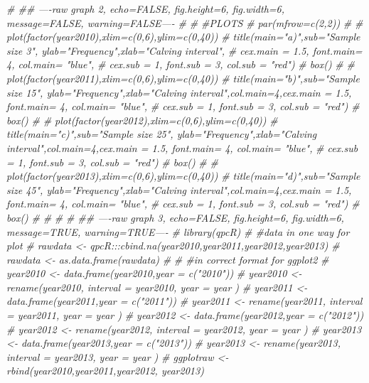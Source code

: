 \documentclass[]{book}
\newenvironment{Shaded}{\begin{snugshade}}{\end{snugshade}}
\newcommand{\CommentTok}[1]{\textcolor[rgb]{0.56,0.35,0.01}{\textit{#1}}}
\begin{document}
\begin{Shaded}
\begin{Highlighting}[]
\CommentTok{# ## ----raw graph 2, echo=FALSE, fig.height=6, fig.width=6, message=FALSE, warning=FALSE----}
\CommentTok{# }
\CommentTok{# #PLOTS}
\CommentTok{# par(mfrow=c(2,2))}
\CommentTok{# }
\CommentTok{# plot(factor(year2010),xlim=c(0,6),ylim=c(0,40))}
\CommentTok{# title(main="a)",sub="Sample size 3", ylab="Frequency",xlab="Calving interval",}
\CommentTok{#       cex.main = 1.5,   font.main= 4, col.main= "blue",}
\CommentTok{#       cex.sub = 1, font.sub = 3, col.sub = "red")}
\CommentTok{# box()}
\CommentTok{# }
\CommentTok{# plot(factor(year2011),xlim=c(0,6),ylim=c(0,40))}
\CommentTok{# title(main="b)",sub="Sample size 15", ylab="Frequency",xlab="Calving interval",col.main=4,cex.main = 1.5,   font.main= 4, col.main= "blue",}
\CommentTok{#       cex.sub = 1, font.sub = 3, col.sub = "red")}
\CommentTok{# box()}
\CommentTok{# }
\CommentTok{# plot(factor(year2012),xlim=c(0,6),ylim=c(0,40))}
\CommentTok{# title(main="c)",sub="Sample size 25", ylab="Frequency",xlab="Calving interval",col.main=4,cex.main = 1.5,   font.main= 4, col.main= "blue",}
\CommentTok{#       cex.sub = 1, font.sub = 3, col.sub = "red")}
\CommentTok{# box()}
\CommentTok{# }
\CommentTok{# plot(factor(year2013),xlim=c(0,6),ylim=c(0,40))}
\CommentTok{# title(main="d)",sub="Sample size 45", ylab="Frequency",xlab="Calving interval",col.main=4,cex.main = 1.5,   font.main= 4, col.main= "blue",}
\CommentTok{#       cex.sub = 1, font.sub = 3, col.sub = "red")}
\CommentTok{# box()}
\CommentTok{# }
\CommentTok{# }
\CommentTok{# }
\CommentTok{# ## ----raw graph 3, echo=FALSE, fig.height=6, fig.width=6, message=TRUE, warning=TRUE----}
\CommentTok{# library(qpcR)}
\CommentTok{# #data in one way for plot}
\CommentTok{# rawdata <- qpcR:::cbind.na(year2010,year2011,year2012,year2013)}
\CommentTok{# rawdata <- as.data.frame(rawdata)}
\CommentTok{# }
\CommentTok{# #in correct format for ggplot2}
\CommentTok{# year2010 <- data.frame(year2010,year = c("2010"))}
\CommentTok{# year2010 <- rename(year2010, interval = year2010, year = year )}
\CommentTok{# year2011 <- data.frame(year2011,year = c("2011"))}
\CommentTok{# year2011 <- rename(year2011, interval = year2011, year = year )}
\CommentTok{# year2012 <- data.frame(year2012,year = c("2012"))}
\CommentTok{# year2012 <- rename(year2012, interval = year2012, year = year )}
\CommentTok{# year2013 <- data.frame(year2013,year = c("2013"))}
\CommentTok{# year2013 <- rename(year2013, interval = year2013, year = year )}
\CommentTok{# ggplotraw <- rbind(year2010,year2011,year2012, year2013)}

\end{Highlighting}
\end{Shaded}
\end{document}
